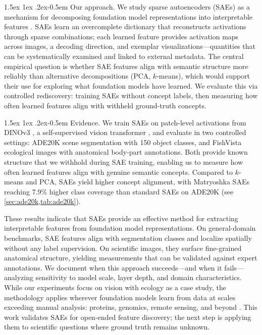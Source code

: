\documentclass{article}
\makeatletter
\renewcommand{\paragraph}{%
  \@startsection{paragraph}{4}%
  {\z@}{1.5ex \@plus 1ex \@minus .2ex}{-0.5em}%
  {\normalfont\normalsize\bfseries}%
}
\theoremstyle{plain}
\theoremstyle{definition}
\theoremstyle{remark}
\makeatother
\begin{document}
\paragraph{Our approach.}
We study sparse autoencoders (SAEs) as a mechanism for decomposing foundation model representations into interpretable features \citep{bricken2023monosemanticity,templeton2024scaling,cunningham2023sparse,gao2025scaling}.
SAEs learn an overcomplete dictionary that reconstructs activations through sparse combinations; each learned feature provides activation maps across images, a decoding direction, and exemplar visualizations—quantities that can be systematically examined and linked to external metadata.
The central empirical question is whether SAE features align with semantic structure more reliably than alternative decompositions (PCA, $k$-means), which would support their use for exploring what foundation models have learned.
We evaluate this via controlled rediscovery: training SAEs without concept labels, then measuring how often learned features align with withheld ground-truth concepts.

\paragraph{Evidence.}
We train SAEs on patch-level activations from DINOv3 \citep{simeoni2025dinov3}, a self-supervised vision transformer \citep{dosovitskiy2020vit}, and evaluate in two controlled settings: ADE20K scene segmentation \citep{zhou2017ade20k} with \num{150} object classes, and FishVista ecological images \citep{mehrab2024fishvista,fishvistadataset} with anatomical body-part annotations.
Both provide known structure that we withhold during SAE training, enabling us to measure how often learned features align with genuine semantic concepts.
Compared to $k$-means and PCA, SAEs yield higher concept alignment, with Matryoshka SAEs \citep{bussmann2025matryoshka} reaching \num{7.9}\% higher class coverage than standard SAEs on ADE20K (see \cref{sec:ade20k,tab:ade20k}).

These results indicate that SAEs provide an effective method for extracting interpretable features from foundation model representations.
On general-domain benchmarks, SAE features align with segmentation classes and localize spatially without any label supervision.
On scientific images, they surface fine-grained anatomical structure, yielding measurements that can be validated against expert annotations.
We document when this approach succeeds—and when it fails—analyzing sensitivity to model scale, layer depth, and domain characteristics.
While our experiments focus on vision with ecology as a case study, the methodology applies wherever foundation models learn from data at scales exceeding manual analysis: proteins, genomics, remote sensing, and beyond \citep{abramson2024alphafold3,lam2023graphcast,cui2024scgpt}.
This work validates SAEs for open-ended feature discovery; the next step is applying them to scientific questions where ground truth remains unknown.
\end{document}
